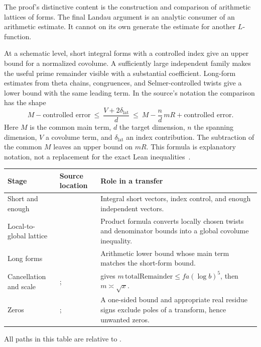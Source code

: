 The proof's distinctive content is the construction and comparison of
arithmetic lattices of forms. The final Landau argument is an analytic
consumer of an arithmetic estimate. It cannot on its own generate the
estimate for another \(L\)-function.

At a schematic level, short integral forms with a controlled index give
an upper bound for a normalized covolume. A sufficiently large independent
family makes the useful prime remainder visible with a substantial
coefficient. Long-form estimates from theta chains, congruences, and
Selmer-controlled twists give a lower bound with the same leading term.
In the source's notation the comparison has the shape
\[
 M-\text{controlled error}
 \ \le\ \frac{V+2\delta_{\mathrm{lat}}}{d}
 \ \le\ M-\frac nd\,mR+\text{controlled error}.
\]
Here \(M\) is the common main term, \(d\) the target dimension, \(n\) the
spanning dimension, \(V\) a covolume term, and
\(\delta_{\mathrm{lat}}\) an index contribution. The subtraction of the
common \(M\) leaves an upper bound on \(mR\).
This formula is explanatory notation, not a replacement for the exact
Lean inequalities~\cite{repo,alpoge-remark}.

\begin{center}
\small
\begin{tabularx}{\textwidth}{@{}>{\raggedright\arraybackslash}p{28mm}YY@{}}
\toprule
Stage & Source location & Role in a transfer\\
\midrule
Short and enough &
 &
Integral short vectors, index control, and enough independent vectors.\\
\addlinespace
Local-to-global lattice &
 &
Product formula converts locally chosen twists and denominator bounds
into a global covolume inequality.\\
\addlinespace
Long forms &
 &
Arithmetic lower bound whose main term matches the short-form bound.\\
\addlinespace
Cancellation and scale &
;
 &
 gives
\(m\,\mathrm{totalRemainder}\le fa(\log b)^5\), then \(m\asymp\sqrt{x}\).\\
\addlinespace
Zeros &
;
 &
A one-sided bound and appropriate real residue signs exclude poles of
a transform, hence unwanted zeros.\\
\bottomrule
\end{tabularx}
\end{center}
All paths in this table are relative to .

